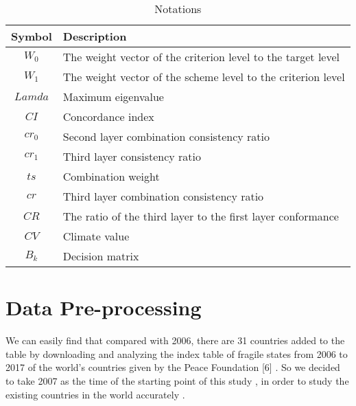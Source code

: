 \documentclass{mcmthesis}
\begin{document}
\begin{table}[htbp]
\begin{center}
\caption{Notations}
\begin{tabular}{cl}
\toprule
Symbol & Description \\%
\midrule
$W_0$ & The weight vector of the criterion level to the target level\\
$W_1$ &The weight vector of the scheme level to the criterion level\\
$Lamda$ &Maximum eigenvalue\\
$CI$ &Concordance index\\
$cr_0$ &Second layer combination consistency ratio\\
$cr_1$ &Third layer consistency ratio\\
$ts$ & Combination weight\\
$cr$ & Third layer combination consistency ratio \\
$CR$ & The ratio of the third layer to the first layer conformance\\
$CV$ & Climate value\\
$B_k$ &Decision matrix \\
\bottomrule
\end{tabular}
\end{center}
\end{table}

\section {Data Pre-processing}
We can easily find that compared with 2006, there are 31 countries added to the table by downloading and analyzing the index table of fragile states from 2006 to 2017 of the world's countries given by the Peace Foundation [6] . So we decided to take 2007 as the time of the starting point of this study , in order to study the existing countries in the world accurately .
\end{document}
